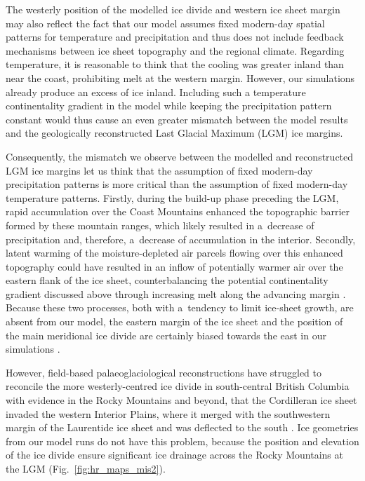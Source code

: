 \documentclass[tc, manuscript]{copernicus}
\begin{document}
      The westerly position of the modelled ice divide and western ice sheet
      margin may also reflect the fact that our model assumes fixed
      modern-day spatial patterns for temperature and precipitation and thus
      does not include feedback mechanisms between ice sheet topography and
      the regional climate. Regarding temperature, it is reasonable to think
      that the cooling was greater inland than near the coast, prohibiting
      melt at the western margin. However, our simulations already produce
      an excess of ice inland. Including such a temperature continentality
      gradient in the model while keeping the precipitation pattern constant
      would thus cause an even greater mismatch between the model results
      and the geologically reconstructed Last Glacial Maximum (LGM) ice
      margins.

      Consequently, the mismatch we observe between the modelled and
      reconstructed LGM ice margins let us think that the assumption of
      fixed modern-day precipitation patterns is more critical than the
      assumption of fixed modern-day temperature patterns.
      Firstly, during the build-up
      phase preceding the LGM, rapid accumulation over the Coast Mountains
      enhanced the topographic barrier formed by these mountain ranges,
      which likely resulted in a~decrease of precipitation and, therefore,
      a~decrease of accumulation in the interior. Secondly, latent warming
      of the moisture-depleted air parcels flowing over this enhanced
      topography could have resulted in an inflow of potentially warmer air
      over the eastern flank of the ice sheet, counterbalancing the potential
      continentality gradient discussed above through increasing melt along the
      advancing margin \citep[cf.][]{Langen.etal.2012}. Because these two
      processes, both with a~tendency to limit ice-sheet growth, are absent
      from our model, the eastern margin of the ice sheet and the position
      of the main meridional ice divide are certainly biased towards the
      east in our simulations \citep{Seguinot.etal.2014}.

      However, field-based palaeoglaciological reconstructions have
      struggled to reconcile the more westerly-centred ice divide in
      south-central British Columbia with evidence in the Rocky Mountains
      and beyond, that the Cordilleran ice sheet invaded the western
      Interior Plains, where it merged with the southwestern margin of the
      Laurentide ice sheet and was deflected to the south
      \citep{Jackson.etal.1997, Bednarski.Smith.2007, Kleman.etal.2010,
      Margold.etal.2013, Margold.etal.2013a}. Ice geometries from our model
      runs do not have this problem, because the position and elevation of
      the ice divide ensure significant ice drainage across the Rocky
      Mountains at the LGM (Fig.~\ref{fig:hr_maps_mis2}).
\end{document}
